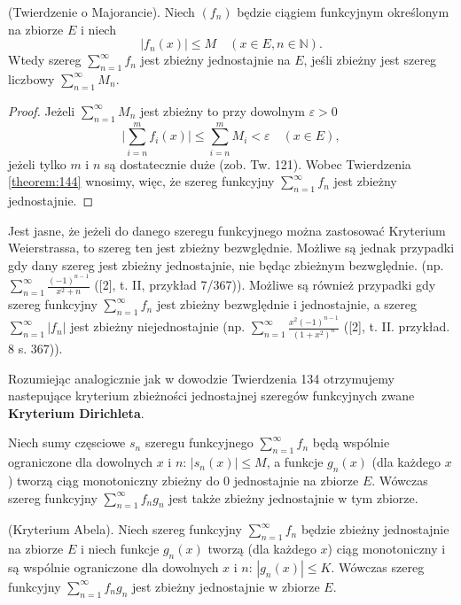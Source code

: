 \documentclass[leqno]{article}
\begin{document}
\begin{justify}
\begin{theorem}
{
    (Twierdzenie o Majorancie). Niech $(f_n)$ będzie ciągiem funkcyjnym określonym na zbiorze $E$ i niech
    \[
        |f_n(x)| \leqslant M \quad (x \in E, n \in \mathbb{N}).
    \]
    Wtedy szereg $\sum\limits_{n=1}^{\infty}f_n$ jest zbieżny jednostajnie na $E$, jeśli zbieżny jest 
    szereg liczbowy $\sum\limits_{n=1}^{\infty}M_n$.
}
\end{theorem}

\begin{proof}
    Jeżeli $\sum\limits_{n=1}^{\infty}M_n$ jest zbieżny to przy dowolnym $\varepsilon > 0$
    \[
        \Bigg|\sum\limits_{i=n}^{m}f_i(x)\Bigg| \leqslant \sum\limits_{i=n}^{m}M_i < \varepsilon \quad (x \in E),
    \]
    jeżeli tylko $m$ i $n$ są dostatecznie duże (zob. Tw. 121). Wobec Twierdzenia \ref{theorem:144} wnosimy, 
    więc, że szereg funkcyjny $\sum\limits_{n=1}^{\infty}f_n$ jest zbieżny jednostajnie.
\end{proof}

\begin{uwaga}
    Jest jasne, że jeżeli do danego szeregu funkcyjnego można zastosować Kryterium Weierstrassa, to szereg ten
    jest zbieżny bezwględnie. Możliwe są jednak przypadki gdy dany szereg jest zbieżny jednostajnie, nie będąc zbieżnym bezwględnie.
    (np. $\sum\limits_{n=1}^{\infty}\frac{(-1)^{n-1}}{x^2+n}$ ([2], t. II, przykład 7/367)). Możliwe są również przypadki gdy szereg
    funkcyjny $\sum\limits_{n=1}^{\infty}f_n$ jest zbieżny bezwględnie i jednostajnie, a szereg $\sum\limits_{n=1}^{\infty}|f_n|$ jest zbieżny
    niejednostajnie (np. $\sum\limits_{n=1}^{\infty}\frac{x^2(-1)^{n-1}}{{(1+x^2)}^n}$ ([2], t. II. przykład. 8 s. 367)).
\end{uwaga}

Rozumiejąc analogicznie jak w dowodzie Twierdzenia 134 otrzymujemy nastepujące kryterium zbieżności jednostajnej szeregów funkcyjnych zwane
\textbf{Kryterium Dirichleta}.

\begin{theorem}
{
    Niech sumy częsciowe $s_n$ szeregu funkcyjnego $\sum\limits_{n=1}^{\infty}f_n$ będą wspólnie ograniczone dla dowolnych $x$ i $n$: 
    $|s_n(x)| \leqslant M$, a funkcje $g_n(x)$ (dla każdego $x$) tworzą ciąg monotoniczny zbieżny do $0$ jednostajnie na zbiorze $E$.
    Wówczas szereg funkcyjny $\sum\limits_{n=1}^{\infty}f_n g_n$ jest także zbieżny jednostajnie w tym zbiorze.
}
\end{theorem}

\begin{theorem}
{
    (Kryterium Abela). Niech szereg funkcyjny $\sum\limits_{n=1}^{\infty}f_n$
    będzie zbieżny jednostajnie na zbiorze $E$ i niech funkcje $g_n(x)$ tworzą (dla każdego $x$) ciąg monotoniczny
    i są wspólnie ograniczone dla dowolnych $x$ i $n$: $|g_n(x)| \leqslant K$. Wówczas szereg
    funkcyjny $\sum\limits_{n=1}^{\infty} f_n g_n$ jest zbieżny jednostajnie w zbiorze $E$.
}
\end{theorem}


\end{justify}
\end{document}
